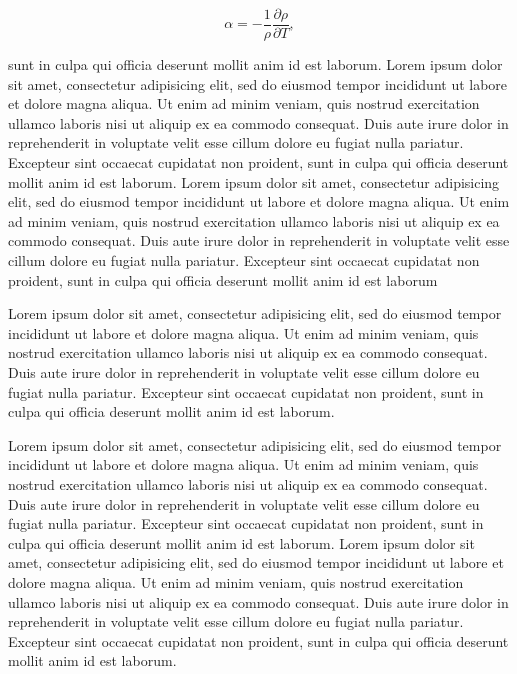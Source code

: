 \documentclass{thesis_proposal}
\begin{document}
\begin{equation}
  \label{e:expansion}
  \alpha = -\frac{1}{\rho}\frac{\partial \rho}{\partial T},
\end{equation}

sunt in culpa qui officia deserunt mollit anim id est laborum. Lorem
ipsum dolor sit amet, consectetur adipisicing elit, sed do eiusmod
tempor incididunt ut labore et dolore magna aliqua. Ut enim ad minim
veniam, quis nostrud exercitation ullamco laboris nisi ut aliquip ex
ea commodo consequat. Duis aute irure dolor in reprehenderit in
voluptate velit esse cillum dolore eu fugiat nulla pariatur. Excepteur
sint occaecat cupidatat non proident, sunt in culpa qui officia
deserunt mollit anim id est laborum.  Lorem ipsum dolor sit amet,
consectetur adipisicing elit, sed do eiusmod tempor incididunt ut
labore et dolore magna aliqua. Ut enim ad minim veniam, quis nostrud
exercitation ullamco laboris nisi ut aliquip ex ea commodo
consequat. Duis aute irure dolor in reprehenderit in voluptate velit
esse cillum dolore eu fugiat nulla pariatur. Excepteur sint occaecat
cupidatat non proident, sunt in culpa qui officia deserunt mollit anim
id est laborum


Lorem ipsum dolor sit amet, consectetur adipisicing elit, sed do
eiusmod tempor incididunt ut labore et dolore magna aliqua. Ut enim ad
minim veniam, quis nostrud exercitation ullamco laboris nisi ut
aliquip ex ea commodo consequat. Duis aute irure dolor in
reprehenderit in voluptate velit esse cillum dolore eu fugiat nulla
pariatur. Excepteur sint occaecat cupidatat non proident, sunt in
culpa qui officia deserunt mollit anim id est laborum.

Lorem ipsum dolor sit amet, consectetur adipisicing elit, sed do
eiusmod tempor incididunt ut labore et dolore magna aliqua. Ut enim ad
minim veniam, quis nostrud exercitation ullamco laboris nisi ut
aliquip ex ea commodo consequat. Duis aute irure dolor in
reprehenderit in voluptate velit esse cillum dolore eu fugiat nulla
pariatur. Excepteur sint occaecat cupidatat non proident, sunt in
culpa qui officia deserunt mollit anim id est laborum. Lorem ipsum
dolor sit amet, consectetur adipisicing elit, sed do eiusmod tempor
incididunt ut labore et dolore magna aliqua. Ut enim ad minim veniam,
quis nostrud exercitation ullamco laboris nisi ut aliquip ex ea
commodo consequat.  Duis aute irure dolor in reprehenderit in
voluptate velit esse cillum dolore eu fugiat nulla pariatur. Excepteur
sint occaecat cupidatat non proident, sunt in culpa qui officia
deserunt mollit anim id est laborum.
\end{document}
